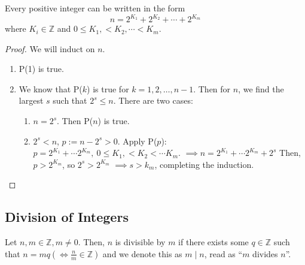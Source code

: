 \documentclass{report}
\newcommand{\Z}{\mathbb{Z}}
\newcommand{\proposition}[1]{\begin{tcolorbox}[title=\textit{Proposition}]{#1}\end{tcolorbox}}
\begin{document}
\proposition{
    Every positive integer can be written in the form 
    \[n = 2^{K_1} + 2^{K_2} + \cdots + 2^{K_m}\]
    where $K_i \in \Z$ and $0 \leq K_1, < K_2, \cdots < K_m$.
}
\begin{proof}
    We will induct on $n$.
    \begin{enumerate}[label=\textit{(\roman*)}]
        \item P(1) is true.
        \item We know that P($k$) is true for $k = 1, 2, \ldots, n - 1$. Then for $n$, we find
            the largest $s$ such that $2^s \leq n$. There are two cases:
            \begin{enumerate}[label=\textit{(\roman*)}]
                \item $n = 2^s$. Then P($n$) is true.
                \item $2^s < n$, $p := n - 2^s > 0$. 
                    \newline
                    Apply P($p$): $p = 2^{K_1} + \cdots 2^{K_m}, \ 0 \leq K_1, < K_2 < \cdots K_m$.
                    \newline
                    $\implies n = 2^{K_1} + \cdots 2^{K_m} + 2^s$ Then, $p > 2^{K_m}$, so $2^s > 2^{K_m}$
                    \newline
                    $\implies s > k_m$, completing the induction.
            \end{enumerate}
    \end{enumerate}
\end{proof}

\subsection{Division of Integers}
Let $n, m \in \Z, m \neq 0$. Then, $n$ is divisible by $m$ if there exists some $q \in \Z$ such that
$n = mq (\iff \frac{n}{m} \in \Z)$ and we denote this as $m \mid n$, read as ``$m$ divides $n$''.
\end{document}
